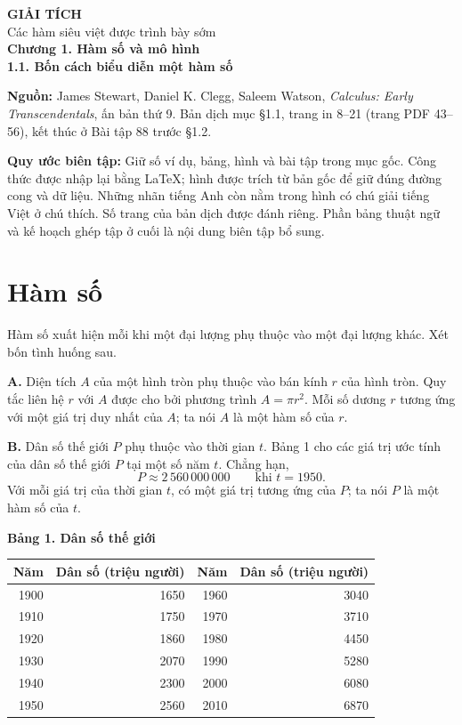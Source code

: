 \documentclass[12pt,a4paper]{article}
\begin{document}
\begin{center}
{\Large\bfseries GIẢI TÍCH}\\[5pt]
{\large Các hàm siêu việt được trình bày sớm}\\[10pt]
{\Large\bfseries Chương 1. Hàm số và mô hình}\\[5pt]
{\large\bfseries 1.1. Bốn cách biểu diễn một hàm số}
\end{center}
\noindent\textbf{Nguồn:} James Stewart, Daniel K. Clegg, Saleem Watson, \textit{Calculus: Early Transcendentals}, ấn bản thứ 9. Bản dịch mục §1.1, trang in 8–21 (trang PDF 43–56), kết thúc ở Bài tập 88 trước §1.2.

\noindent\textbf{Quy ước biên tập:} Giữ số ví dụ, bảng, hình và bài tập trong mục gốc. Công thức được nhập lại bằng LaTeX; hình được trích từ bản gốc để giữ đúng đường cong và dữ liệu. Những nhãn tiếng Anh còn nằm trong hình có chú giải tiếng Việt ở chú thích. Số trang của bản dịch được đánh riêng. Phần bảng thuật ngữ và kế hoạch ghép tập ở cuối là nội dung biên tập bổ sung.

\section*{Hàm số}
Hàm số xuất hiện mỗi khi một đại lượng phụ thuộc vào một đại lượng khác. Xét bốn tình huống sau.

\noindent\textbf{A.} Diện tích $A$ của một hình tròn phụ thuộc vào bán kính $r$ của hình tròn. Quy tắc liên hệ $r$ với $A$ được cho bởi phương trình $A=\pi r^2$. Mỗi số dương $r$ tương ứng với một giá trị duy nhất của $A$; ta nói $A$ là một hàm số của $r$.

\noindent\textbf{B.} Dân số thế giới $P$ phụ thuộc vào thời gian $t$. Bảng 1 cho các giá trị ước tính của dân số thế giới $P$ tại một số năm $t$. Chẳng hạn,
\[P\approx2\,560\,000\,000\qquad\text{khi }t=1950.\]
Với mỗi giá trị của thời gian $t$, có một giá trị tương ứng của $P$; ta nói $P$ là một hàm số của $t$.

\begin{center}\textbf{Bảng 1. Dân số thế giới}\\[4pt]
\begin{tabular}{rr@{\qquad}rr}\toprule
Năm&Dân số (triệu người)&Năm&Dân số (triệu người)\\\midrule
1900&1650&1960&3040\\1910&1750&1970&3710\\1920&1860&1980&4450\\1930&2070&1990&5280\\1940&2300&2000&6080\\1950&2560&2010&6870\\\bottomrule
\end{tabular}\end{center}
\end{document}
